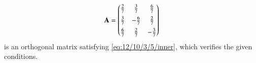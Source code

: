 \begin{align}
\mathbf{A} = 	\begin{pmatrix}
	\frac{2}{7} & \frac{3}{7} & \frac{6}{7} \\[1ex]
    \frac{3}{7} & -\frac{6}{7} & \frac{2}{7} \\[1ex]
    \frac{6}{7} & \frac{2}{7} & -\frac{3}{7}
\end{pmatrix}
\end{align}
is an orthogonal matrix satisfying
\eqref{eq:12/10/3/5/inner},
which verifies the given conditions.
